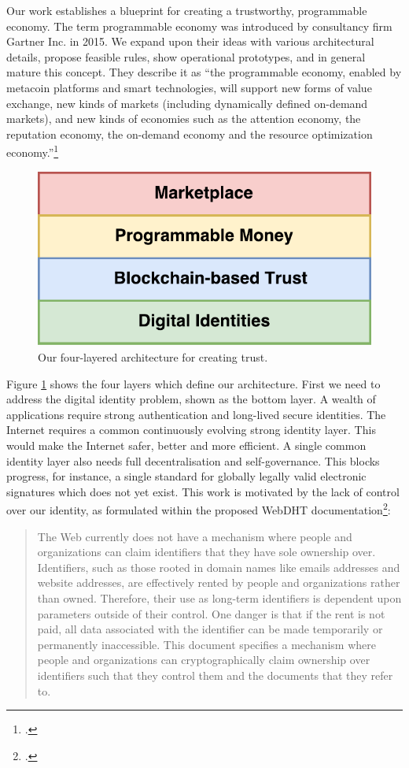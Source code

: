 \documentclass[USenglish]{article}
\begin{document}
Our work establishes a blueprint for creating a trustworthy, programmable economy.
The term programmable economy was introduced by consultancy firm Gartner Inc. in 2015. 
We expand upon their ideas with various architectural details, propose feasible rules, show operational prototypes, and in general mature this concept.
They describe it as ``the programmable economy, enabled by metacoin platforms and smart technologies, will support new forms of value exchange, new kinds of markets (including dynamically defined on-demand markets), and new kinds of economies such as the attention economy, the reputation economy, the on-demand economy and the resource optimization economy.''\footcite{gartnerprogrammableeconomy}

\begin{figure}[t]
	\centering
	\includegraphics[width=1\columnwidth]{assets/tech_stack_simple}
	\caption{Our four-layered architecture for creating trust.}
	\label{fig:tech_stack_simple}
\end{figure}

Figure \ref{fig:tech_stack_simple} shows the four layers which define our architecture.
First we need to address the digital identity problem, shown as the bottom layer.
A wealth of applications require strong authentication and long-lived secure identities.
The Internet requires a common continuously evolving strong identity layer.
This would make the Internet safer, better and more efficient.
A single common identity layer also needs full decentralisation and self-governance.
This blocks progress, for instance, a single standard for globally legally valid electronic signatures which does not yet exist.
This work is motivated by the lack of control over our identity, as formulated within the proposed WebDHT documentation\footcite{webdhtproposal}: 

\blockquote{The Web currently does not have a mechanism where people and organizations can claim identifiers that they have sole ownership over. Identifiers, such as those rooted in domain names like emails addresses and website addresses, are effectively rented by people and organizations rather than owned. Therefore, their use as long-term identifiers is dependent upon parameters outside of their control. One danger is that if the rent is not paid, all data associated with the identifier can be made temporarily or permanently inaccessible. This document specifies a mechanism where people and organizations can cryptographically claim ownership over identifiers such that they control them and the documents that they refer to.}
\end{document}
